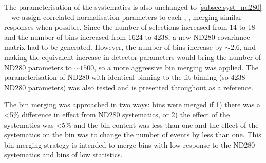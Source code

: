 The parameterisation of the systematics is also unchanged to \autoref{subsec:syst_nd280}---we assign correlated normalisation parameters to each \pmu, \cosmu, merging similar responses when possible. Since the number of selections increased from 14 to 18 and the number of bins increased from 1624 to 4238, a new ND280 covariance matrix had to be generated. However, the number of bins increase by $\sim2.6$, and making the equivalent increase in detector parameters would bring the number of ND280 parameters to $\sim1500$, so a more aggressive bin merging was applied. The parameterisation of ND280 with identical binning to the fit binning (so 4238 ND280 parameters) was also tested and is presented throughout as a reference.

The bin merging was approached in two ways: bins were merged if 1) there was a <5\% difference in effect from ND280 systematics, or 2) the effect of the systematics was <5\% and the bin content was less than one and the effect of the systematics on the bin was to change the number of events by less than one. This bin merging strategy is intended to merge bins with low response to the ND280 systematics and bins of low statistics. 

